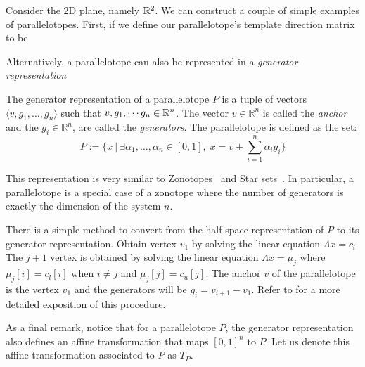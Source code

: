 \begin{example}
\label{ex:simple_ptope}
Consider the 2D plane, namely ${\mathbb{R}}^2$. We can construct a couple of simple examples of parallelotopes. First, if we define our parallelotope's template direction matrix to be
\end{example}


\noindent Alternatively, a parallelotope can also be represented in a \emph{generator representation}
%
\begin{definition}
The generator representation of a parallelotope $P$ is a tuple of vectors $\langle v, g_1, \ldots, g_n\rangle$ such that $v,g_1, \cdots g_n \in {\mathbb{R}}^n$. The vector  $v \in \mathbb{R}^n$ is called the \emph{anchor} and the $g_i \in \mathbb{R}^n$, are called the \emph{generators}. The parallelotope is defined as the set:
$$
P := \{ x ~|~ \exists \alpha_1, \ldots, \alpha_n \in [0,1], \; x = v + \sum_{i=1}^n \alpha_i g_i \}
$$
\end{definition}
%
\noindent This representation is very similar to Zonotopes~\cite{girard2005reachability,althoff2010computing} and Star sets~\cite{duggirala2016parsimonious}.
%
In particular, a parallelotope is a special case of a zonotope where the number of generators is exactly the dimension of the system $n$.

There is a simple method to convert from the half-space representation of $P$ to its generator representation.
%
Obtain vertex $v_1$ by solving the linear equation $\Lambda x = c_{l}$.
%
The $j+1$ vertex is obtained by solving the linear equation $\Lambda x = \mu_{j}$ where $\mu_{j}[i] = c_{l}[i]$ when $i \neq j$ and $\mu_{j}[j] = c_{u}[j]$.
%
The anchor $v$ of the parallelotope is the vertex $v_1$ and the generators will be $g_{i} = v_{i+1} - v_{1}$. Refer to \cite{dang2014parameter} for a more detailed exposition of this procedure.

%
As a final remark, notice that for a parallelotope $P$, the generator representation also defines an affine transformation that maps $[0,1]^{n}$ to $P$.
%
Let us denote this affine transformation associated to $P$ as $T_P$.

